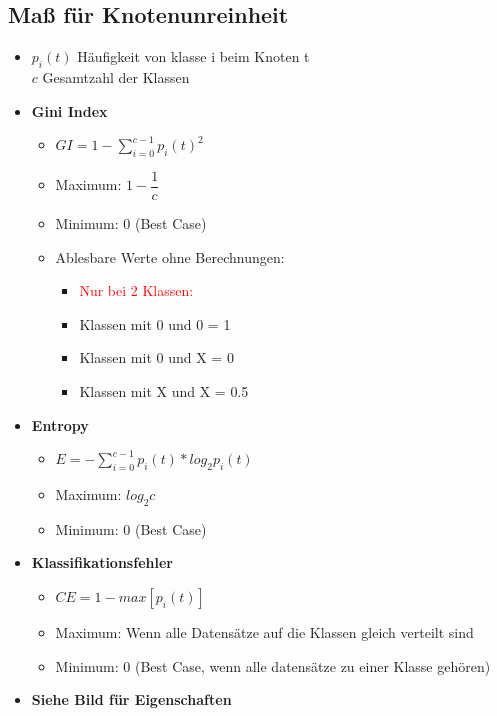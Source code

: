 \documentclass[a4paper]{article}
\begin{document}
\begin{landscape}
\begin{multicols}{3}
        \subsection{Maß für Knotenunreinheit}
        \begin{itemize}[noitemsep,nolistsep]
            \item $p_i(t)$ Häufigkeit von klasse i beim Knoten t\\ $c$ Gesamtzahl der Klassen
            \item \textbf{Gini Index}
                    \begin{itemize}[noitemsep,nolistsep]
                        \item $ GI = 1 - \sum_{i=0}^{c-1} p_i(t)^2$
                        \item Maximum: $1-\dfrac{1}{c}$
                        \item Minimum: 0 (Best Case)
                        \item Ablesbare Werte ohne Berechnungen:
                        \begin{itemize}[noitemsep,nolistsep]
                            \item \textcolor{red}{Nur bei 2 Klassen:}
                            \item Klassen mit 0 und 0 = 1
                            \item Klassen mit 0 und X = 0
                            \item Klassen mit X und X = 0.5
                        \end{itemize}
                        
                    \end{itemize}
            \item \textbf{Entropy}
                    \begin{itemize}[noitemsep,nolistsep]
                        \item $ E = - \sum_{i=0}^{c-1} p_i(t) * log_2 p_i(t)$
                        \item Maximum: $log_2 c$
                        \item Minimum: 0 (Best Case)
                    \end{itemize}
            \item \textbf{Klassifikationsfehler}
                    \begin{itemize}[noitemsep,nolistsep]
                        \item $ CE = 1 - max[p_i(t)]$
                        \item Maximum: Wenn alle Datensätze auf die Klassen gleich verteilt sind 
                        \item Minimum: 0 (Best Case, wenn alle datensätze zu einer Klasse gehören)
                    \end{itemize}
            \item \textbf{Siehe Bild für Eigenschaften}
        \end{itemize}


\end{multicols}
\end{landscape}
\end{document}
